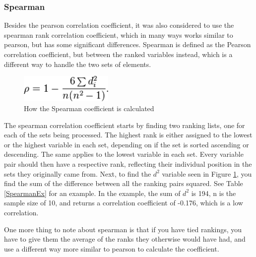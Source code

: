 \subsubsection{Spearman}

Besides the pearson correlation coefficient, it was also considered to use the spearman rank correlation coefficient, which in many ways works similar to pearson, but has some significant differences. Spearman is defined as the Pearson correlation coefficient, but between the ranked variables instead, which is a different way to handle the two sets of elements. \cite{Spearman2}

\begin{figure}[htb]
\centering
\includegraphics[width=0.4\textwidth]{Images/SpearmanCalc.png}
\caption{How the Spearman coefficient is calculated}
\label{SpearCalc}
\end{figure}

The spearman correlation coefficient starts by finding two ranking lists, one for each of the sets being processed. The highest rank is either assigned to the lowest or the highest variable in each set, depending on if the set is sorted ascending or descending. The same applies to the lowest variable in each set. Every variable pair should then have a respective rank, reflecting their individual position in the sets they originally came from. Next, to find the $d^2$ variable seen in Figure \ref{SpearCalc}, you find the sum of the difference between all the ranking pairs squared. See Table \ref{SpearmanEx} for an example. In the example, the sum of $d^2$ is 194, n is the sample size of 10, and returns a correlation coefficient of -0.176, which is a low correlation. \cite{Spearman2}

One more thing to note about spearman is that if you have tied rankings, you have to give them the average of the ranks they otherwise would have had, and use a different way more similar to pearson to calculate the coefficient. \cite{Spearman1}

